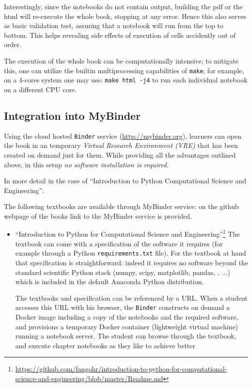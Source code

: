 \documentclass{deliverablereport}
\begin{document}
{{{Interestingly, since the notebooks do not contain output, building the
pdf or the html will re-execute the whole book, stopping at any error.
Hence this also serves as basic validation test, assuring that a
notebook will run from the top to bottom. This helps revealing side
effects of execution of cells accidently out of order.

The execution of the whole book can be computationally intensive; to
mitigate this, one can utilize the builtin multiprocessing
capabilities of \texttt{make}; for example, on a 4-cores system one
may use: \texttt{make html -j4} to run each individual notebook on a
different CPU core.

\subsection{Integration into MyBinder}



Using the cloud hosted \texttt{Binder} service
(\url{http://mybinder.org}), learners can open the book in an
temporary \emph{Virtual Research Environment (VRE)} that has been
created on demand just for them. While providing all the advantages
outlined above, in this setup \emph{no software installation is
  required}.

In more detail in the case of ``Introduction to Python Computational
Science and Engineering'':




The following textbooks are available through MyBinder service: on the
github webpage of the books link to the MyBinder service is provided.

\begin{itemize}
\item ``Introduction to Python for Computational Science and Engineering''\footnote{\scriptsize\url{https://github.com/fangohr/introduction-to-python-for-computational-science-and-engineering/blob/master/Readme.md}}
The textbook can come with a specification of the software it requires
(for example through a Python \texttt{requirements.txt} file). For the
textbook at hand that specification is straightforward: indeed it
requires no software beyond the standard scientific Python stack
(numpy, scipy, matplotlib, pandas, \Jupyter, ...) which is included in
the default Anaconda Python distribution.

The textbooks and specification can be referenced by a URL. When a
student accesses this URL with his browser, the \texttt{Binder}
constructs on demand a Docker image including a copy of the notebooks
and the required software, and provisions a temporary Docker container
(lightweight virtual machine) running a \Jupyter notebook server. The
student can browse through the textbook, and execute chapter notebooks
as they like to achieve better



\end{itemize}}}}
\end{document}
